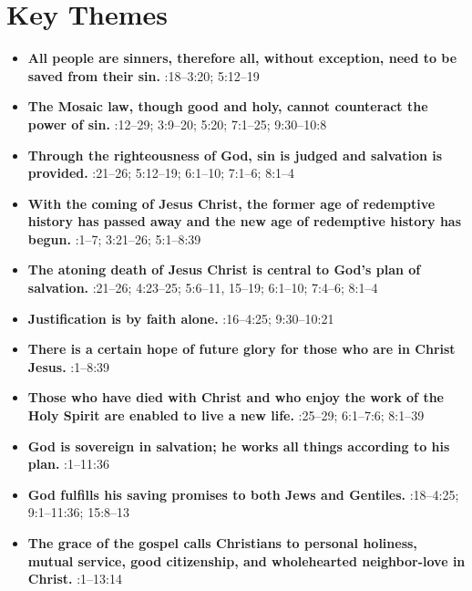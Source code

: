 \documentclass{article}
\begin{document}
\section{Key Themes}

\begin{itemize}
    \item \textbf{All people are sinners, therefore all, without exception, need to be saved from their sin.}
    :18–3:20; 5:12–19
    \item \textbf{The Mosaic law, though good and holy, cannot counteract the power of sin.}
    :12–29; 3:9–20; 5:20; 7:1–25; 9:30–10:8
    \item \textbf{Through the righteousness of God, sin is judged and salvation is provided.}
    :21–26; 5:12–19; 6:1–10; 7:1–6; 8:1–4
    \item \textbf{With the coming of Jesus Christ, the former age of redemptive history has passed away and the new age of redemptive history has begun.}
    :1–7; 3:21–26; 5:1–8:39
    \item \textbf{The atoning death of Jesus Christ is central to God’s plan of salvation.}
    :21–26; 4:23–25; 5:6–11, 15–19; 6:1–10; 7:4–6; 8:1–4
    \item \textbf{Justification is by faith alone.}
    :16–4:25; 9:30–10:21
    \item \textbf{There is a certain hope of future glory for those who are in Christ Jesus.}
    :1–8:39
    \item \textbf{Those who have died with Christ and who enjoy the work of the Holy Spirit are enabled to live a new life.}
    :25–29; 6:1–7:6; 8:1–39
    \item \textbf{God is sovereign in salvation; he works all things according to his plan.}
    :1–11:36
    \item \textbf{God fulfills his saving promises to both Jews and Gentiles.}
    :18–4:25; 9:1–11:36; 15:8–13
    \item \textbf{The grace of the gospel calls Christians to personal holiness, mutual service, good citizenship, and wholehearted neighbor-love in Christ.}
    :1–13:14
\end{itemize}
\end{document}

